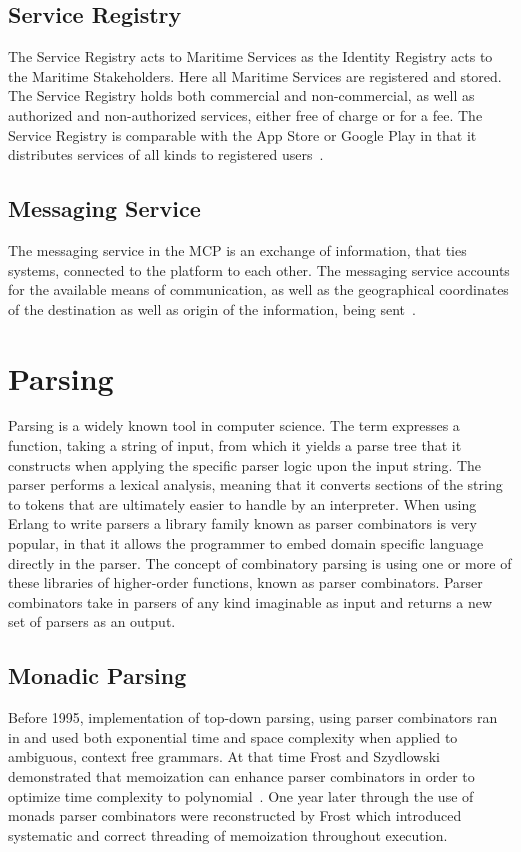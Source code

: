 \subsection{Service Registry}
The Service Registry acts to Maritime Services as the Identity Registry acts to the Maritime Stakeholders. Here all Maritime Services are registered and stored. The Service Registry holds both commercial and non-commercial, as well as authorized and non-authorized services, either free of charge or for a fee. The Service Registry is comparable with the App Store or Google Play in that it distributes services of all kinds to registered users~\cite{efficienSea2}.
\subsection{Messaging Service}
The messaging service in the MCP is an exchange of information, that ties systems, connected to the platform to each other. The messaging service accounts for the available means of communication, as well as the geographical coordinates of the destination as well as origin of the information, being sent~\cite{efficienSea2}.

\section{Parsing}
Parsing is a widely known tool in computer science. The term expresses a function, taking a string of input, from which it yields a parse tree that it constructs when applying the specific parser logic upon the input string. The parser performs a lexical analysis, meaning that it converts sections of the string to tokens that are ultimately easier to handle by an interpreter. When using Erlang to write parsers a library family known as parser combinators is very popular, in that it allows the programmer to embed domain specific language directly in the parser. The concept of combinatory parsing is using one or more of these libraries of higher-order functions, known as parser combinators. Parser combinators take in parsers of any kind imaginable as input and returns a new set of parsers as an output.
\newpage
\subsection{Monadic Parsing}
Before 1995, implementation of top-down parsing, using parser combinators ran in and used both exponential time and space complexity when applied to ambiguous, context free grammars. At that time Frost and Szydlowski demonstrated that memoization can enhance parser combinators in order to optimize time complexity to polynomial~\cite{memoization}. One year later through the use of monads parser combinators were reconstructed by Frost which introduced systematic and correct threading of memoization throughout execution.

